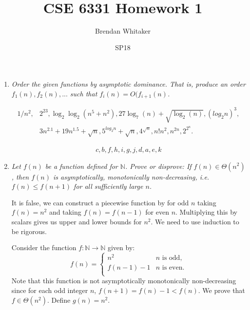 \documentclass[10pt,oneside,reqno]{amsart}
\theoremstyle{plain}
\theoremstyle{definition}
\begin{document}
\title{CSE 6331 Homework 1}

\date{SP18}

\author[Brendan Whitaker]{Brendan Whitaker}

\maketitle

\begin{enumerate}[label=\arabic*.]
\item \textit{Order the given functions by asymptotic dominance. That is, produce an order $f_1(n),f_2(n),...$ such that $f_i(n) = O(f_{i + 1}(n)$. }


\begin{equation}
\begin{aligned}
1/n^2, &2^{23}, \log_2 \log_2(n^5 + n^2), 27 \log_7(n) + \sqrt{\log_2(n)}, (log_2n)^3,\\ &3n^{2.1} + 19n^{1.5} + \sqrt{n},
5^{log_2n} + \sqrt{n},  4^{\sqrt{n}}, n!n^2, n^{2n}, 2^{2^n}. 
\end{aligned}
\end{equation}

\begin{equation}
\begin{aligned}
c,b,f,h,i,g,j,d,a,e,k
\end{aligned}
\end{equation}

\item \textit{Let $f(n)$ be a function defined for $\mathbb{N}$. Prove or disprove: If $f(n) \in \Theta(n^2)$, then $f(n)$ is asymptotically, monotonically non-decreasing, i.e. $f(n) \leq f(n + 1)$ for all sufficiently large $n$. }

It is false, we can construct a piecewise function by for odd $n$ taking $f(n) = n^2$ and taking $f(n) = f(n - 1)$ for even $n$. Multiplying this by scalars gives us upper and lower bounds for $n^2$. We need to use induction to be rigorous. 

Consider the function $f:\mathbb{N} \to \mathbb{N}$ given by: 
$$
f(n) = 
\begin{cases}
n^2 & n \text{ is odd},\\
f(n - 1) - 1 & n \text{ is even}.\\
\end{cases}
$$
Note that this function is not asymptotically monotonically non-decreasing since for each odd integer $n$, $f(n + 1) = f(n) - 1 < f(n)$. We prove that $f \in \Theta(n^2)$. Define $g(n)  = n^2$. 


\end{enumerate}
\end{document}
